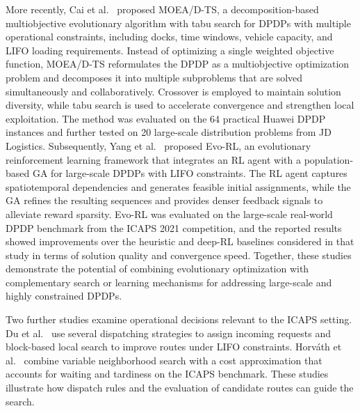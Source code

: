 \documentclass[pdflatex]{sn-jnl}
\begin{document}
More recently, Cai et al.~\cite{cai2024decomposition} proposed MOEA/D-TS, a decomposition-based multiobjective evolutionary algorithm with tabu search for DPDPs with multiple operational constraints, including docks, time windows, vehicle capacity, and LIFO loading requirements. Instead of optimizing a single weighted objective function, MOEA/D-TS reformulates the DPDP as a multiobjective optimization problem and decomposes it into multiple subproblems that are solved simultaneously and collaboratively. Crossover is employed to maintain solution diversity, while tabu search is used to accelerate convergence and strengthen local exploitation. The method was evaluated on the 64 practical Huawei DPDP instances and further tested on 20 large-scale distribution problems from JD Logistics. Subsequently, Yang et al.~\cite{yang2026collaborative} proposed Evo-RL, an evolutionary reinforcement learning framework that integrates an RL agent with a population-based GA for large-scale DPDPs with LIFO constraints. 
The RL agent captures spatiotemporal dependencies and generates feasible initial assignments, while the GA refines the resulting sequences and provides denser 
feedback signals to alleviate reward sparsity. Evo-RL was evaluated on the large-scale real-world DPDP benchmark from the ICAPS 2021 competition, and the 
reported results showed improvements over the heuristic and deep-RL baselines considered in that study in terms of solution quality and convergence speed. Together, these studies demonstrate the potential of combining evolutionary optimization with complementary search or learning mechanisms for addressing large-scale and highly constrained DPDPs.

Two further studies examine operational decisions relevant to the ICAPS setting. Du et al.~\cite{du2023hierarchical} use several dispatching strategies to assign incoming requests and block-based local search to improve routes under LIFO constraints. Horv\'ath et al.~\cite{horvath2025cost} combine variable neighborhood search with a cost approximation that accounts for waiting and tardiness on the ICAPS benchmark. These studies illustrate how dispatch rules and the evaluation of candidate routes can guide the search.
\end{document}
